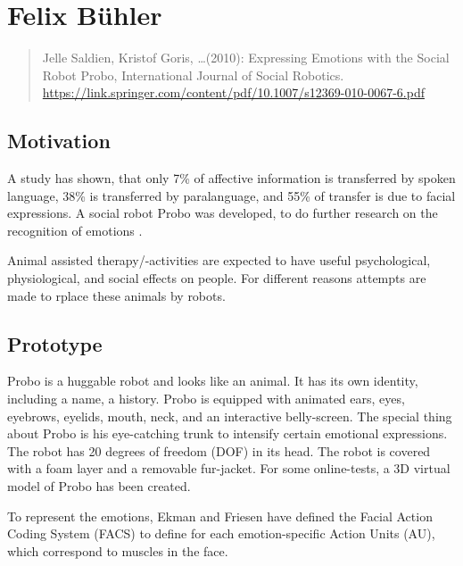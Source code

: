 \documentclass[smallheadings,english, DIV14]{scrartcl}
\begin{document}
\thispagestyle{empty}

\section*{Felix Bühler}
%
\begin{quote}
	Jelle Saldien, Kristof Goris, \ldots (2010): Expressing Emotions with the Social Robot Probo, International Journal of Social Robotics. \url{https://link.springer.com/content/pdf/10.1007/s12369-010-0067-6.pdf}
\end{quote}

\subsection*{Motivation}

A study has shown, that only 7\% of affective information is transferred
by spoken language, 38\% is transferred by paralanguage, and 55\% of transfer is due to facial expressions. A social robot Probo was developed, to do further research on the recognition of emotions .

Animal assisted therapy/-activities are expected to have useful psychological, physiological, and social effects on people. For different reasons attempts are made to rplace these animals by robots. 

\subsection*{Prototype}

Probo is a huggable robot and looks like an animal. It has its own identity, including a name, a history. Probo is equipped with animated ears, eyes, eyebrows, eyelids, mouth, neck, and an interactive belly-screen. The special thing about Probo is his eye-catching trunk to intensify certain emotional expressions. The robot has 20 degrees of freedom (DOF) in its head. The robot is covered with a foam layer and a removable fur-jacket. For some online-tests, a 3D virtual model of Probo has been created. 

To represent the emotions, Ekman and Friesen have defined the Facial Action Coding System (FACS) to define for each emotion-specific Action Units (AU), which correspond to muscles in the face.
\end{document}
